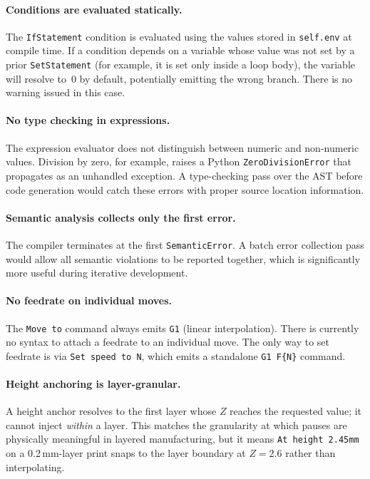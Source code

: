 \paragraph{Conditions are evaluated statically.}
The \texttt{IfStatement} condition is evaluated using the values stored in \texttt{self.env} at compile time. If a condition depends on a variable whose value was not set by a prior \texttt{SetStatement} (for example, it is set only inside a loop body), the variable will resolve to~0 by default, potentially emitting the wrong branch. There is no warning issued in this case.

\paragraph{No type checking in expressions.}
The expression evaluator does not distinguish between numeric and non-numeric values. Division by zero, for example, raises a Python \texttt{ZeroDivisionError} that propagates as an unhandled exception. A type-checking pass over the AST before code generation would catch these errors with proper source location information.

\paragraph{Semantic analysis collects only the first error.}
The compiler terminates at the first \texttt{SemanticError}. A batch error collection pass would allow all semantic violations to be reported together, which is significantly more useful during iterative development.

\paragraph{No feedrate on individual moves.}
The \texttt{Move to} command always emits \texttt{G1} (linear interpolation). There is currently no syntax to attach a feedrate to an individual move. The only way to set feedrate is via \texttt{Set speed to N}, which emits a standalone \texttt{G1 F\{N\}} command.

\paragraph{Height anchoring is layer-granular.}
A height anchor resolves to the first layer whose $Z$ reaches the requested value; it cannot inject \emph{within} a layer. This matches the granularity at which pauses are physically meaningful in layered manufacturing, but it means \texttt{At height 2.45mm} on a 0.2\,mm-layer print snaps to the layer boundary at $Z = 2.6$ rather than interpolating.

